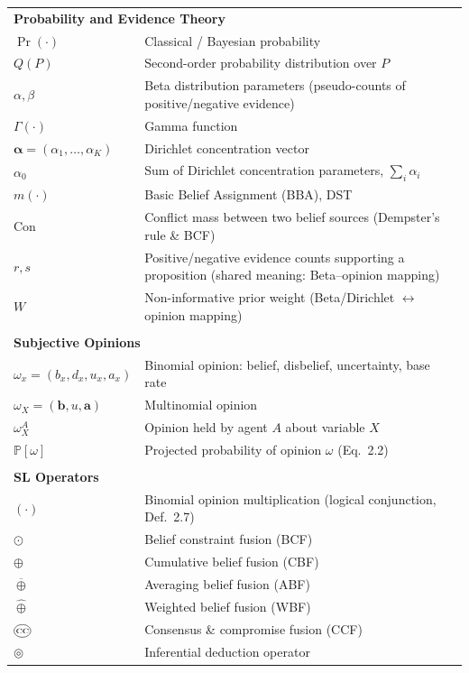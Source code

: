 \begin{longtable}{lp{9cm}}
\hline
\multicolumn{2}{l}{\textbf{Probability and Evidence Theory}} \\
$\Pr(\cdot)$ & Classical / Bayesian probability \\
$Q(P)$ & Second-order probability distribution over $P$ \\
$\alpha, \beta$ & Beta distribution parameters (pseudo-counts of positive/negative evidence) \\
$\Gamma(\cdot)$ & Gamma function \\
$\boldsymbol{\alpha} = (\alpha_1,\dots,\alpha_K)$ & Dirichlet concentration vector \\
$\alpha_0$ & Sum of Dirichlet concentration parameters, $\sum_i \alpha_i$ \\
$m(\cdot)$ & Basic Belief Assignment (BBA), DST \\
$\mathrm{Con}$ & Conflict mass between two belief sources (Dempster's rule \& BCF) \\
$r, s$ & Positive/negative evidence counts supporting a proposition (shared meaning: Beta--opinion mapping) \\
$W$ & Non-informative prior weight (Beta/Dirichlet $\leftrightarrow$ opinion mapping) \\[4pt]
\hline
\\
\hline
\multicolumn{2}{l}{\textbf{Subjective Opinions}} \\
$\omega_x = (b_x, d_x, u_x, a_x)$ & Binomial opinion: belief, disbelief, uncertainty, base rate \\
$\omega_X = (\mathbf{b}, u, \mathbf{a})$ & Multinomial opinion \\
$\omega_X^A$ & Opinion held by agent $A$ about variable $X$ \\
$\mathbb{P}[\omega]$ & Projected probability of opinion $\omega$ (Eq.~2.2) \\[4pt]
\hline
\\
\hline
\multicolumn{2}{l}{\textbf{\acs{SL} Operators}} \\
$(\cdot)$ & Binomial opinion multiplication (logical conjunction, Def.~2.7) \\
$\odot$ & Belief constraint fusion (BCF) \\
$\oplus$ & Cumulative belief fusion (CBF) \\
$\overline{\oplus}$ & Averaging belief fusion (ABF) \\
$\hat{\oplus}$ & Weighted belief fusion (WBF) \\
$\occ$ & Consensus \& compromise fusion (CCF) \\
$\circledcirc$ & Inferential deduction operator \\

\end{longtable}
